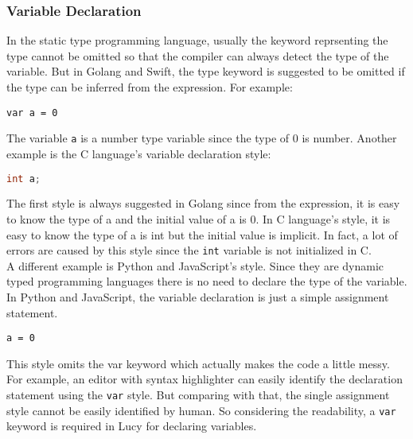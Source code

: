 \subsubsection{Variable Declaration}
In the static type programming language, usually the keyword reprsenting the type cannot be omitted so that the compiler can always detect the type of the variable. But in Golang and Swift, the type keyword is suggested to be omitted if the type can be inferred from the expression. For example:
\begin{lstlisting}
var a = 0
\end{lstlisting}
The variable \texttt{a} is a number type variable since the type of 0 is number. Another example is the C language's variable declaration style:
\begin{lstlisting}[language=c]
int a;
\end{lstlisting}
The first style is always suggested in Golang since from the expression, it is easy to know the type of a and the initial value of a is 0. In C language's style, it is easy to know the type of a is int but the initial value is implicit. In fact, a lot of errors are caused by this style since the \texttt{int} variable is not initialized in C. \\
A different example is Python and JavaScript's style. Since they are dynamic typed programming languages there is no need to declare the type of the variable. In Python and JavaScript, the variable declaration is just a simple assignment statement.
\begin{lstlisting}
a = 0
\end{lstlisting}
This style omits the var keyword which actually makes the code a little messy. For example, an editor with syntax highlighter can easily identify the declaration statement using the \texttt{var} style. But comparing with that, the single assignment style cannot be easily identified by human. So considering the readability, a \texttt{var} keyword is required in Lucy for declaring variables.

